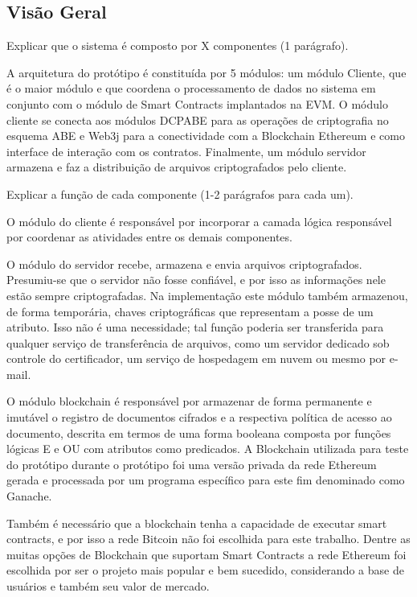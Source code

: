 \documentclass[a4paper,11pt]{article}
\begin{document}
\subsection{Visão Geral}
\label{sec:visaogeral}

{\color{ForestGreen}Explicar que o sistema é composto por X componentes (1 parágrafo).}

A arquitetura do protótipo é constituída por 5 módulos: um módulo Cliente, que é o maior módulo e que coordena o processamento de dados no sistema em conjunto com o módulo de Smart Contracts implantados na EVM.
O módulo cliente se conecta aos módulos DCPABE para as operações de criptografia no esquema ABE e Web3j para a conectividade com a Blockchain Ethereum e como interface de interação com os contratos.
Finalmente, um módulo servidor armazena e faz a distribuição de arquivos criptografados pelo cliente.

{\color{ForestGreen}Explicar a função de cada componente (1-2 parágrafos para cada um).}

O módulo do cliente é responsável por incorporar a camada lógica responsável por coordenar as atividades entre os demais componentes.

O módulo do servidor recebe, armazena e envia arquivos criptografados.
Presumiu-se que o servidor não fosse confiável, e por isso as informações nele estão sempre criptografadas.
Na implementação este módulo também armazenou, de forma temporária, chaves criptográficas que representam a posse de um atributo. Isso não é uma necessidade; tal função poderia ser transferida para qualquer serviço de transferência de arquivos, como um servidor dedicado sob controle do certificador, um serviço de hospedagem em nuvem ou mesmo por e-mail.

O módulo blockchain é responsável por armazenar de forma permanente e imutável o registro de documentos cifrados e a respectiva política de acesso ao documento, descrita em termos de uma forma booleana composta por funções lógicas E e OU com atributos como predicados.
A Blockchain utilizada para teste do protótipo durante o protótipo foi uma versão privada da rede Ethereum gerada e processada por um programa específico para este fim denominado como Ganache.

Também é necessário que a blockchain tenha a capacidade de executar smart contracts, e por isso a rede Bitcoin não foi escolhida para este trabalho.
Dentre as muitas opções de Blockchain que suportam Smart Contracts a rede Ethereum foi escolhida por ser o projeto mais popular e bem sucedido, considerando a base de usuários e também seu valor de mercado.
\end{document}
